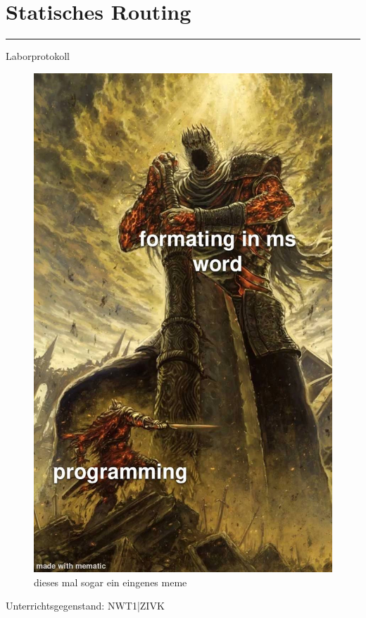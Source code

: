 \documentclass[a4paper]{article}
\begin{document}
\pagestyle{oida}
\section*{Statisches Routing}
\par\noindent\rule{\textwidth}{0.4pt}

Laborprotokoll

\begin{figure}[h]
	\includegraphics[scale=0.35]{meme.jpeg}
	\caption{dieses mal sogar ein eingenes meme}
\end{figure}

\vspace*{\fill}
Unterrichtsgegenstand:	NWT1|ZIVK
\end{document}
